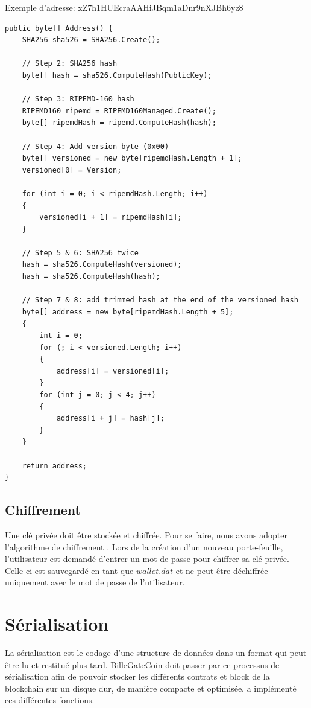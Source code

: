 \documentclass{article}
\begin{document}
Exemple d'adresse: xZ7h1HUEcraAAHiJBqm1aDnr9nXJBh6yz8
\filbreak
\begin{verbatim}
public byte[] Address() {
    SHA256 sha526 = SHA256.Create();

    // Step 2: SHA256 hash
    byte[] hash = sha526.ComputeHash(PublicKey);

    // Step 3: RIPEMD-160 hash
    RIPEMD160 ripemd = RIPEMD160Managed.Create();
    byte[] ripemdHash = ripemd.ComputeHash(hash);
    
    // Step 4: Add version byte (0x00)
    byte[] versioned = new byte[ripemdHash.Length + 1];
    versioned[0] = Version;
    
    for (int i = 0; i < ripemdHash.Length; i++)
    {
        versioned[i + 1] = ripemdHash[i];
    }

    // Step 5 & 6: SHA256 twice
    hash = sha526.ComputeHash(versioned);
    hash = sha526.ComputeHash(hash);
    
    // Step 7 & 8: add trimmed hash at the end of the versioned hash
    byte[] address = new byte[ripemdHash.Length + 5];
    {
        int i = 0;
        for (; i < versioned.Length; i++)
        {
            address[i] = versioned[i];
        }
        for (int j = 0; j < 4; j++)
        {
            address[i + j] = hash[j];
        }
    }

    return address;
}
\end{verbatim}

\subsection{Chiffrement}
Une clé privée doit être stockée et chiffrée. Pour se faire, nous avons adopter l'algorithme de chiffrement . Lors de la création d'un nouveau porte-feuille, l'utilisateur est demandé d'entrer un mot de passe pour chiffrer sa clé privée. Celle-ci est sauvegardé en tant que $wallet.dat$ et ne peut être déchiffrée uniquement avec le mot de passe de l'utilisateur.

\section{Sérialisation}
La sérialisation est le codage d'une structure de données dans un format qui peut être lu et restitué plus tard. BilleGateCoin doit passer par ce processus de sérialisation afin de pouvoir stocker les différents contrats et block de la blockchain sur un disque dur, de manière compacte et optimisée.  a implémenté ces différentes fonctions.
\end{document}
